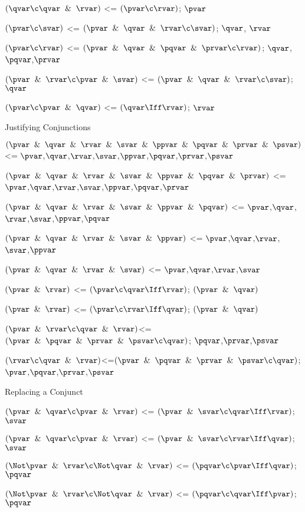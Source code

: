 $(\qvar \c \qvar \And \rvar)$ <= $(\pvar \c \rvar)$; $\pvar$

$(\pvar \c \svar)$ <= $(\pvar \And \qvar \And \rvar \c \svar)$; $\qvar$, $\rvar$

$(\pvar \c \rvar)$ <= $(\pvar \And \qvar \And \pqvar \And \prvar \c \rvar)$; $\qvar$, $\pqvar$,$\prvar$

$(\pvar \And \rvar\c \pvar \And \svar)$ <=  $(\pvar \And \qvar \And \rvar \c \svar)$;$\qvar$

$(\pvar  \c \pvar \And \qvar)$ <= $(\qvar \Iff \rvar )$; $\rvar$

\lineb

Justifying Conjunctions

$(\pvar \And \qvar \And \rvar \And \svar\And \ppvar\And \pqvar \And \prvar \And \psvar)$ <= $\pvar$,$\qvar$,$\rvar$,$\svar$,$\ppvar$,$\pqvar$,$\prvar$,$\psvar$

$(\pvar \And \qvar \And \rvar \And \svar\And \ppvar\And \pqvar \And \prvar)$ <= $\pvar$,$\qvar$,$\rvar$,$\svar$,$\ppvar$,$\pqvar$,$\prvar$

$(\pvar \And \qvar \And \rvar \And \svar\And \ppvar\And \pqvar )$ <= $\pvar$,$\qvar$,$\rvar$,$\svar$,$\ppvar$,$\pqvar$

$(\pvar \And \qvar \And \rvar \And \svar\And \ppvar)$ <= $\pvar$,$\qvar$,$\rvar$,$\svar$,$\ppvar$

$(\pvar \And \qvar \And \rvar \And \svar)$ <= $\pvar$,$\qvar$,$\rvar$,$\svar$

$(\pvar \And \rvar)$ <= $(\pvar \c \qvar \Iff \rvar)$; $(\pvar \And\qvar)$

$(\pvar \And \rvar)$ <= $(\pvar \c \rvar \Iff \qvar)$; $(\pvar\And \qvar)$

$(\pvar \And \rvar \c \qvar \And \rvar)$<=$(\pvar \And \pqvar \And \prvar \And \psvar \c \qvar)$; $\pqvar$,$\prvar$,$\psvar$

$(\rvar \c \qvar \And \rvar)$<=$(\pvar \And \pqvar \And \prvar \And \psvar \c \qvar)$; $\pvar$,$\pqvar$,$\prvar$,$\psvar$

\lineb

Replacing a Conjunct

$(\pvar \And \qvar \c \pvar \And \rvar)$ <= $(\pvar \And \svar \c \qvar \Iff \rvar)$;$\svar$

$(\pvar \And \qvar \c \pvar \And \rvar)$ <= $(\pvar \And \svar \c \rvar \Iff \qvar)$;$\svar$

$(\Not \pvar \And \rvar \c \Not \qvar\And \rvar )$ <= $(\pqvar \c \pvar \Iff\qvar)$;$\pqvar$

$(\Not \pvar \And \rvar \c \Not \qvar\And \rvar )$ <= $(\pqvar \c \qvar \Iff\pvar)$;$\pqvar$

